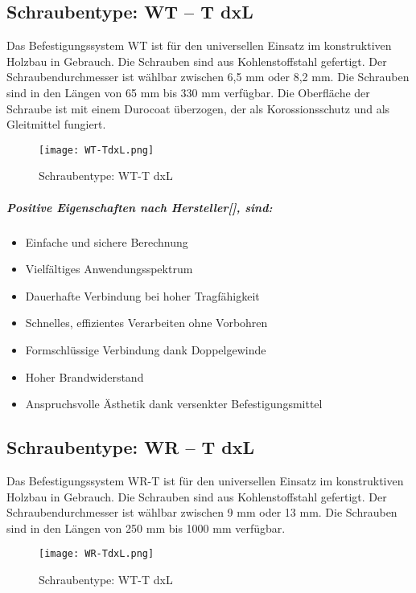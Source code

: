 \documentclass[12 pt,a4 paper ]{scrreprt}
\begin{document}
\subsection{Schraubentype: WT – T dxL }
Das Befestigungssystem WT ist für den universellen Einsatz im konstruktiven Holzbau in Gebrauch. Die Schrauben sind aus Kohlenstoffstahl gefertigt. Der Schraubendurchmesser ist wählbar zwischen 6,5 mm oder 8,2 mm. Die Schrauben sind in den Längen von  65 mm bis 330 mm verfügbar. Die Oberfläche der Schraube ist mit einem Durocoat überzogen, der als Korossionsschutz und als Gleitmittel fungiert.

\begin{figure}[h]
\begin{center}
\texttt{[image: WT-TdxL.png]}
\caption{Schraubentype: WT-T dxL}
\end{center}
\end{figure}

\subparagraph{Positive Eigenschaften nach Hersteller[], sind:}

\begin{itemize}
	\item Einfache und sichere Berechnung
	\item Vielfältiges Anwendungsspektrum
	\item Dauerhafte Verbindung  bei hoher Tragfähigkeit
	\item Schnelles, effizientes Verarbeiten ohne Vorbohren
	\item Formschlüssige Verbindung  dank Doppelgewinde
	\item Hoher Brandwiderstand
	\item Anspruchsvolle Ästhetik dank versenkter Befestigungsmittel
	
\end{itemize}

\subsection{Schraubentype:	 WR – T  dxL}
Das Befestigungssystem WR-T ist für den universellen Einsatz im konstruktiven Holzbau in Gebrauch. Die Schrauben sind aus Kohlenstoffstahl gefertigt. Der Schraubendurchmesser ist wählbar zwischen 9 mm oder 13 mm. Die Schrauben sind in den Längen von  250 mm bis 1000 mm verfügbar. 

\begin{figure}[h]
\begin{center}
\texttt{[image: WR-TdxL.png]}
\caption{Schraubentype: WT-T dxL}
\end{center}
\end{figure}
\end{document}
